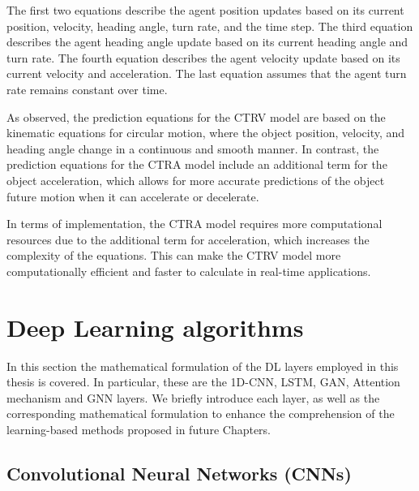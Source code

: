 The first two equations describe the agent position updates based on its current position, velocity, heading angle, turn rate, and the time step. The third equation describes the agent heading angle update based on its current heading angle and turn rate. The fourth equation describes the agent velocity update based on its current velocity and acceleration. The last equation assumes that the agent turn rate remains constant over time.

As observed, the prediction equations for the \ac{CTRV} model are based on the kinematic equations for circular motion, where the object position, velocity, and heading angle change in a continuous and smooth manner. In contrast, the prediction equations for the \ac{CTRA} model include an additional term for the object acceleration, which allows for more accurate predictions of the object future motion when it can accelerate or decelerate.

In terms of implementation, the \ac{CTRA} model requires more computational resources due to the additional term for acceleration, which increases the complexity of the equations. This can make the \ac{CTRV} model more computationally efficient and faster to calculate in real-time applications. 

\section{Deep Learning algorithms}
\label{sec:3_dlb_formulation}

In this section the mathematical formulation of the \ac{DL} layers employed in this thesis is covered. In particular, these are the 1D-\ac{CNN}, \ac{LSTM}, \ac{GAN}, Attention mechanism and \ac{GNN} layers. We briefly introduce each layer, as well as the corresponding mathematical formulation to enhance the comprehension of the learning-based methods proposed in future Chapters.

\subsection{Convolutional Neural Networks (CNNs)}
\label{subsec:3_cnns}



